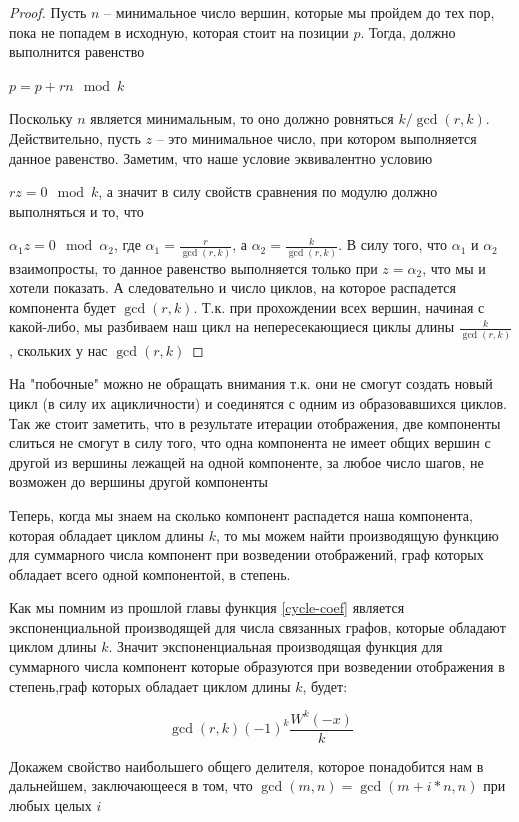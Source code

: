 \documentclass[10pt, a4paper]{report}
\begin{document}
\begin{proof}
	
	Пусть $n$ -- минимальное число вершин, которые мы пройдем до тех пор, пока не попадем в исходную, которая стоит на позиции $p$. Тогда, должно выполнится равенство
	
	$p=p+r n\mod k$
	
	Поскольку $n$ является минимальным, то оно должно ровняться $k/\gcd(r,k)$. Действительно, пусть $z$ -- это минимальное число, при котором выполняется данное равенство. Заметим, что наше условие эквивалентно условию
	
	$r z = 0\mod k$, а значит в силу свойств сравнения по модулю должно выполняться и то, что 
	
	$\alpha_1 z = 0 \mod \alpha_2$, где $\alpha_1= \frac r {\gcd(r,k)}$, а $\alpha_2= \frac k {\gcd(r,k)}$. В силу того, что $\alpha_1$ и $\alpha_2$ взаимопросты, то данное равенство выполняется только при $z=\alpha_2$, что мы и хотели показать. А следовательно и число циклов, на которое распадется компонента будет $\gcd(r,k)$. Т.к. при прохождении всех вершин, начиная с какой-либо, мы разбиваем наш цикл на непересекающиеся циклы длины $\frac k {\gcd(r,k)}$, скольких у нас ${\gcd(r,k)}$
\end{proof}	

На "побочные" можно не обращать внимания т.к. они не смогут создать новый цикл (в силу их ацикличности) и соединятся с одним из образовавшихся циклов. Так же стоит заметить, что в результате итерации отображения, две компоненты слиться не смогут в силу того, что одна компонента не имеет общих вершин с другой из вершины лежащей на одной компоненте, за любое число шагов, не возможен до вершины другой компоненты

Теперь, когда мы знаем на сколько компонент распадется наша компонента, которая обладает циклом длины $k$, то мы можем найти производящую функцию для суммарного числа компонент при возведении отображений, граф которых обладает всего одной компонентой, в степень. 

Как мы помним из прошлой главы функция \eqref{cycle-coef} является экспоненциальной производящей для числа связанных графов, которые обладают циклом длины $k$. Значит экспоненциальная производящая функция для суммарного числа компонент которые образуются при возведении отображения в степень,граф которых обладает циклом длины $k$, будет:

$$\gcd(r,k) (-1)^{k} \frac{W^k(-x)}{k}$$

Докажем свойство наибольшего общего делителя, которое понадобится нам в дальнейшем, заключающееся в том, что $\gcd(m,n)=\gcd(m+i*n,n)$ при любых целых $i$
\end{document}
